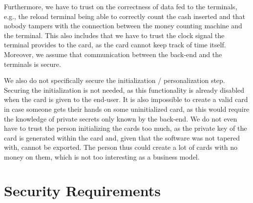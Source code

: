 Furthermore, we have to trust on the correctness of data fed to the terminals, e.g., the reload terminal being able to correctly count the cash inserted and that nobody tampers with the connection between the money counting machine and the terminal.
This also includes that we have to trust the clock signal the terminal provides to the card, as the card cannot keep track of time itself.
Moreover, we assume that communication between the back-end and the terminals is secure.

We also do not specifically secure the initialization / personalization step.
Securing the initialization is not needed, as this functionality is already disabled when the card is given to the end-user.
It is also impossible to create a valid card in case someone gets their hands on some uninitialized card, as this would require the knowledge of private secrets only known by the back-end.
We do not even have to trust the person initializing the cards too much, as the private key of the card is generated within the card and, given that the software was not tapered with, cannot be exported.
The person thus could create a lot of cards with no money on them, which is not too interesting as a business model.


\section{Security Requirements}

